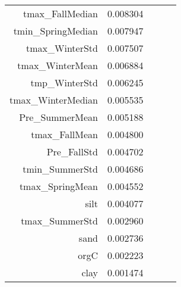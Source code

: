 \begin{tabular}{rrrrr}
tmax_FallMedian & 0.008304 \\
tmin_SpringMedian & 0.007947 \\
tmax_WinterStd & 0.007507 \\
tmax_WinterMean & 0.006884 \\
tmp_WinterStd & 0.006245 \\
tmax_WinterMedian & 0.005535 \\
Pre_SummerMean & 0.005188 \\
tmax_FallMean & 0.004800 \\
Pre_FallStd & 0.004702 \\
tmin_SummerStd & 0.004686 \\
tmax_SpringMean & 0.004552 \\
silt & 0.004077 \\
tmax_SummerStd & 0.002960 \\
sand & 0.002736 \\
orgC & 0.002223 \\
clay & 0.001474 \\
\bottomrule
\end{tabular}
